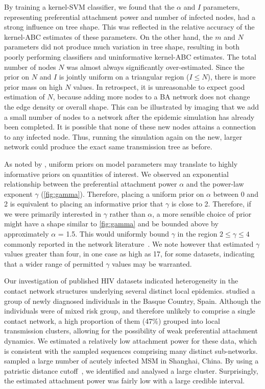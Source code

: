 \documentclass[12pt]{article}\usepackage[]{graphicx}\usepackage[]{color}
\begin{document}
By training a kernel-SVM classifier, we found that the $\alpha$ and $I$
parameters, representing preferential attachment power and number of infected
nodes, had a strong influence on tree shape. This was reflected in the relative
accuracy of the kernel-ABC estimates of these parameters. On the other hand,
the $m$ and $N$ parameters did not produce much variation in tree shape,
resulting in both poorly performing classifiers and uninformative kernel-ABC
estimates. The total number of nodes $N$ was almost always significantly
over-estimated. Since the prior on $N$ and $I$ is jointly uniform on a
triangular region ($I \leq N$), there is more prior mass on high $N$ values. In
retrospect, it is unreasonable to expect good estimation of $N$, because adding
more nodes to a \gls{BA} network does not change the edge density or overall
shape. This can be illustrated by imaging that we add a small number of nodes
to a network after the epidemic simulation has already been completed. It is
possible that none of these new nodes attains a connection to any infected
node. Thus, running the simulation again on the new, larger network could
produce the exact same transmission tree as before. 

As noted by \textcite{lintusaari2016identifiability}, uniform priors on model
parameters may translate to highly informative priors on quantities of
interest. We observed an exponential relationship between the preferential
attachment power $\alpha$ and the power-law exponent $\gamma$
(\cref{fig:gamma}). Therefore, placing a uniform prior on $\alpha$ between 0
and 2 is equivalent to placing an informative prior that $\gamma$ is close to
2. Therefore, if we were primarily interested in $\gamma$ rather than $\alpha$,
a more sensible choice of prior might have a shape similar to \cref{fig:gamma}
and be bounded above by approximately $\alpha$ = 1.5. This would uniformly
bound $\gamma$ in the region $2 \leq \gamma \leq 4$ commonly reported in the
network literature~\autocite{liljeros2001web, schneeberger2004scale,
colgate1989risk, brown2011transmission}. We note however that
\textcite{jones2003assessment} estimated $\gamma$ values greater than four, in
one case as high as 17, for some datasets, indicating that a wider range of
permitted $\gamma$ values may be warranted.

Our investigation of published HIV datasets indicated heterogeneity in the
contact network structures underlying several distinct local epidemics.
\textcite{cuevas2009hiv} studied a group of newly diagnosed individuals in the
Basque Country, Spain. Although the individuals were of mixed risk group, and
therefore unlikely to comprise a single contact network, a high proportion of
them (47\%) grouped into local transmission clusters, allowing for the
possibility of weak preferential attachment dynamics. We estimated a relatively
low attachment power for these data, which is consistent with the sampled
sequences comprising many distinct sub-networks. \textcite{li2015hiv} sampled a
large number of acutely infected \gls{MSM} in Shanghai, China. By using a
patristic distance cutoff~\autocite{poon2014impact}, we identified and analysed
a large cluster. Surprisingly, the estimated attachment power was fairly low
with a large credible interval.
\end{document}
